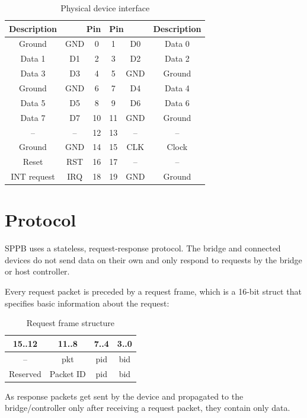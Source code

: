 \documentclass[a4paper,10pt]{article}
\begin{document}
\begin{table}[H]
	\centering
	\caption{Physical device interface}
	{
		\begin{tabular}{|c|c|c|c|c|c|}
\hline
Description & \multicolumn{2}{|r|}{Pin} & \multicolumn{2}{|l|}{Pin} & Description \\
\hline
Ground & GND & 0 & 1 & D0 & Data 0 \\
\hline
Data 1 & D1 & 2 & 3 & D2 & Data 2 \\
\hline
Data 3 & D3 & 4 & 5 & GND & Ground \\
\hline
Ground & GND & 6 & 7 & D4 & Data 4 \\
\hline
Data 5 & D5 & 8 & 9 & D6 & Data 6 \\
\hline
Data 7 & D7 & 10 & 11 & GND & Ground \\
\hline
-- & -- & 12 & 13 & -- & -- \\
\hline
Ground & GND & 14 & 15 & CLK & Clock \\
\hline
Reset & RST & 16 & 17 & -- & -- \\
\hline
INT request & IRQ & 18 & 19 & GND & Ground \\
\hline
		\end{tabular}
	}
\end{table}

\section{Protocol}
\acrshort{SPPB} uses a stateless, request-response protocol. The bridge and connected devices do not send data on their own and only respond to requests by the bridge or host controller.

Every request packet is preceded by a request frame, which is a 16-bit struct that specifies basic information about the request:

\begin{table}[H] \label{P:RF}
	\centering
	\caption{Request frame structure}
	{
		\begin{tabular}{|c|c|c|c|}
\hline
15..12 & 11..8 & 7..4 & 3..0 \\
\hline
-- & pkt & pid & bid \\
\hline
Reserved & Packet ID & \gls{pid} & \gls{bid} \\
\hline
		\end{tabular}
	}
\end{table}

As response packets get sent by the device and propagated to the bridge/controller only after receiving a request packet, they contain only data.
\\
\end{document}
